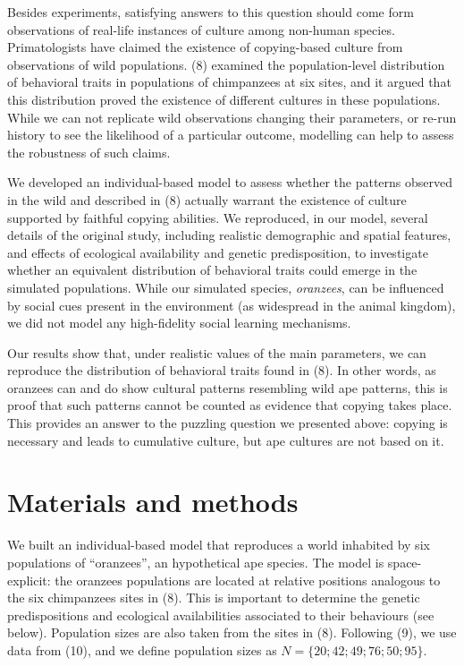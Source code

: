 \documentclass[9pt,twocolumn,twoside,]{pnas-new}
\begin{document}
Besides experiments, satisfying answers to this question should come
form observations of real-life instances of culture among non-human
species. Primatologists have claimed the existence of copying-based
culture from observations of wild populations. (8) examined the
population-level distribution of behavioral traits in populations of
chimpanzees at six sites, and it argued that this distribution proved
the existence of different cultures in these populations. While we can
not replicate wild observations changing their parameters, or re-run
history to see the likelihood of a particular outcome, modelling can
help to assess the robustness of such claims.

We developed an individual-based model to assess whether the patterns
observed in the wild and described in (8) actually warrant the existence
of culture supported by faithful copying abilities. We reproduced, in
our model, several details of the original study, including realistic
demographic and spatial features, and effects of ecological availability
and genetic predisposition, to investigate whether an equivalent
distribution of behavioral traits could emerge in the simulated
populations. While our simulated species, \emph{oranzees}, can be
influenced by social cues present in the environment (as widespread in
the animal kingdom), we did not model any high-fidelity social learning
mechanisms.

Our results show that, under realistic values of the main parameters, we
can reproduce the distribution of behavioral traits found in (8). In
other words, as oranzees can and do show cultural patterns resembling
wild ape patterns, this is proof that such patterns cannot be counted as
evidence that copying takes place. This provides an answer to the
puzzling question we presented above: copying is necessary and leads to
cumulative culture, but ape cultures are not based on it.

\section*{Materials and methods}\label{materials-and-methods}

We built an individual-based model that reproduces a world inhabited by
six populations of ``oranzees'', an hypothetical ape species. The model
is space-explicit: the oranzees populations are located at relative
positions analogous to the six chimpanzees sites in (8). This is
important to determine the genetic predispositions and ecological
availabilities associated to their behaviours (see below). Population
sizes are also taken from the sites in (8). Following (9), we use data
from (10), and we define population sizes as
\(N=\{20;42;49;76;50;95\}\).
\end{document}
